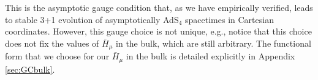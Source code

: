 \documentclass[a4paper,11pt]{article}
\numberwithin{equation}{section}
\begin{document}
This is the asymptotic gauge condition that, as we have empirically verified, leads to stable 3+1 evolution of asymptotically AdS$_4$ spacetimes in Cartesian coordinates. However, this gauge choice is not unique, e.g., notice that this choice does not fix the values of $\bar{H}_\mu$ in the bulk, which are still arbitrary. 
The functional form that we choose for our $\bar{H}_\mu$  in the bulk is detailed explicitly in Appendix \ref{sec:GCbulk}.
\end{document}
